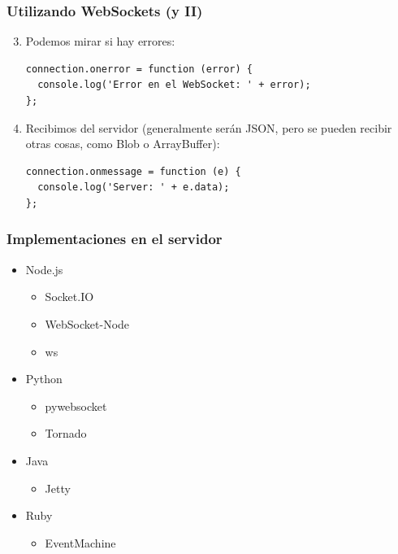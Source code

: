 \begin{frame}[fragile]
\frametitle{Utilizando WebSockets (y II)}

\begin{enumerate}
  \setcounter{enumi}{2}

  \item Podemos mirar si hay errores:
\begin{verbatim}
connection.onerror = function (error) {
  console.log('Error en el WebSocket: ' + error);
};
\end{verbatim}

  \item Recibimos del servidor (generalmente serán JSON, pero se pueden recibir otras cosas, como Blob o ArrayBuffer):
\begin{verbatim}
connection.onmessage = function (e) {
  console.log('Server: ' + e.data);
};
\end{verbatim}

\end{enumerate}

\end{frame}



\begin{frame}
\frametitle{Implementaciones en el servidor}

\begin{itemize}
  \item Node.js
  \begin{itemize}
    \item Socket.IO
    \item WebSocket-Node
    \item ws
  \end{itemize}
  \item Python
  \begin{itemize}
    \item pywebsocket
    \item Tornado
  \end{itemize}
  \item Java
  \begin{itemize}
    \item Jetty
  \end{itemize}
  \item Ruby
  \begin{itemize}
    \item EventMachine
  \end{itemize}
\end{itemize}
\end{frame}


